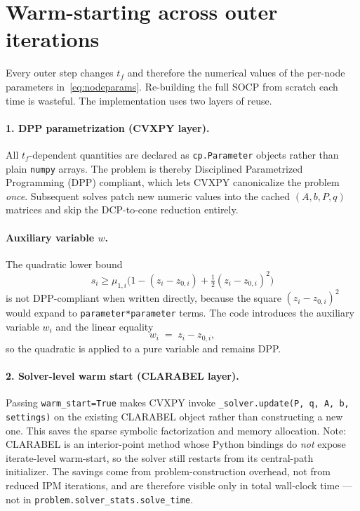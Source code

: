 \documentclass[11pt]{article}
\begin{document}
\section{Warm-starting across outer iterations}

Every outer step changes $t_f$ and therefore the numerical values of the
per-node parameters in~\eqref{eq:nodeparams}. Re-building the full SOCP from
scratch each time is wasteful. The implementation uses two layers of reuse.

\paragraph{1. DPP parametrization (CVXPY layer).} All $t_f$-dependent
quantities are declared as \texttt{cp.Parameter} objects rather than plain
\texttt{numpy} arrays. The problem is thereby Disciplined Parametrized
Programming (DPP) compliant, which lets CVXPY canonicalize the problem
\emph{once}. Subsequent solves patch new numeric values into the cached
$(A, b, P, q)$ matrices and skip the DCP-to-cone reduction entirely.

\paragraph{Auxiliary variable $w$.} The quadratic lower bound
\begin{equation}
  s_i \ge \mu_{1,i}\bigl(1 - (z_i - z_{0,i}) + \tfrac{1}{2}(z_i - z_{0,i})^2\bigr)
\end{equation}
is not DPP-compliant when written directly, because the square
$(z_i - z_{0,i})^2$ would expand to \texttt{parameter*parameter} terms. The
code introduces the auxiliary variable $w_i$ and the linear equality
\begin{equation}
  w_i \;=\; z_i - z_{0,i},
\end{equation}
so the quadratic is applied to a pure variable and remains DPP.

\paragraph{2. Solver-level warm start (CLARABEL layer).} Passing
\texttt{warm\_start=True} makes CVXPY invoke
\texttt{\_solver.update(P, q, A, b, settings)} on the existing CLARABEL
object rather than constructing a new one. This saves the sparse symbolic
factorization and memory allocation. Note: CLARABEL is an interior-point
method whose Python bindings do \emph{not} expose iterate-level warm-start,
so the solver still restarts from its central-path initializer. The savings
come from problem-construction overhead, not from reduced IPM iterations,
and are therefore visible only in total wall-clock time --- not in
\texttt{problem.solver\_stats.solve\_time}.
\end{document}
